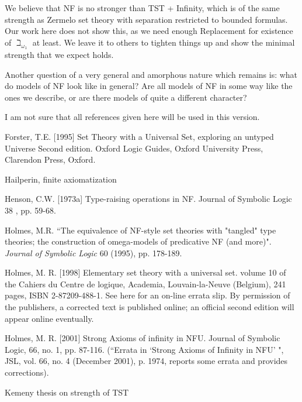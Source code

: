 \documentclass[112pt]{article}
\begin{document}
We believe that NF is no stronger than TST + Infinity, which is of the same strength as Zermelo set theory with separation restricted to bounded formulas.  Our work here does not show this, as we need enough Replacement for
existence of $\beth_{\omega_1}$ at least.  We leave it to others to tighten things up and show the minimal strength that we expect holds.

Another question of a very general and amorphous nature which remains is:  what do models of NF look like in general?  Are all models of NF in some way like the ones we describe, or are there models of quite a different character?

\newpage

I am not sure that all references given here will be used in this version.

\begin{thebibliography}{99}





  Forster, T.E. [1995] 
Set Theory with a Universal Set, exploring an untyped Universe 
Second edition. Oxford Logic Guides, Oxford University Press, Clarendon Press, Oxford.

 Hailperin, finite axiomatization

   Henson, C.W. [1973a] 
Type-raising operations in NF. 
Journal of Symbolic Logic 38 , pp. 59-68.

  Holmes, M.R.
``The equivalence of NF-style set theories with "tangled" type theories; the construction of omega-models of predicative NF (and more)". 
{\em Journal of Symbolic Logic\/} 60 (1995), pp. 178-189.

  Holmes, M. R. [1998] 
Elementary set theory with a universal set. 
volume 10 of the Cahiers du Centre de logique, Academia, Louvain-la-Neuve (Belgium), 241 pages, ISBN 2-87209-488-1. See here for an on-line errata slip. By permission of the publishers, a corrected text is published online; an official second edition will appear online eventually.

   Holmes, M. R. [2001]
Strong Axioms of infinity in NFU.
Journal of Symbolic Logic, 66, no. 1, pp. 87-116.  \newline(``Errata in `Strong
Axioms of Infinity in NFU' ", JSL, vol. 66, no. 4 (December
2001), p. 1974, reports some errata and provides corrections).

  Kemeny thesis on strength of TST


\end{thebibliography}
\end{document}
